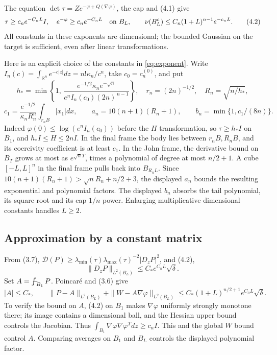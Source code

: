 \documentclass[11pt,reqno]{amsart}
\numberwithin{equation}{section}
\theoremstyle{remark}
\theoremstyle{definition}
\newcommand{\fint}{\mathop{\rlap{\hspace{0.15em}$-$}\!\int}\nolimits}
\begin{document}
The equation \(\det\tau=Z e^{-\varphi+Q(\nabla\varphi)}\), the cap and (4.1) give
\[
\tau\ge c_n e^{-C_nL}I,\quad e^{-\varphi}\ge c_ne^{-C_nL}
\quad\hbox{on }B_L,\qquad
\nu(B_L^c)\le C_n(1+L)^{n-1}e^{-c_nL}.                \tag{4.2}
\]
All constants in these exponents are dimensional; the bounded Gaussian on the target is sufficient, even after linear transformations.

Here is an explicit choice of the constants in \eqref{eq:exponent}. Write
\(I_n(c)=\int_{\mathbb R^n}e^{-c|z|}dz=n!\kappa_n/c^n\), take \(c_0=c_n^{(0)}\), and put
\[
h_*=\min\!\left\{1,\,
\frac{e^{-1/2}\kappa_n e^{-\sqrt n}}
{e^n I_n(c_0)(2n)^{\,n-1}}\right\},\quad
r_n=(2n)^{-1/2},\quad R_n=\sqrt{n/h_*},
\]
\[
c_1=\frac{e^{-1/2}}{\kappa_nR_n^n}
          \int_{r_nB}|x_1|dx,\qquad
a_n=10(n+1)(R_n+1),\qquad
b_n=\min\{1,c_1/(8n)\}.                               \tag{4.2a}
\]
Indeed \(\varphi(0)\le\log(e^nI_n(c_0))\) before the \(H\) transformation, so \(\tau\ge h_*I\) on \(B_1\), and \(h_*I\le H\le2nI\). In the final frame the body lies between \(r_nB,R_nB\), and its coercivity coefficient is at least \(c_1\). In the John frame, the derivative bound on $B_T$ grows at most as $e^{\sqrt n T}$, times a polynomial of degree at most $n/2+1$. A cube $[-L,L]^n$ in the final frame pulls back into $B_{R_nL}$. Since $10(n+1)(R_n+1)>\sqrt n R_n+n/2+3$, the displayed $a_n$ bounds the resulting exponential and polynomial factors. The displayed \(b_n\) absorbs the tail polynomial, its square root and its cap \(1/n\) power. Enlarging multiplicative dimensional constants handles \(L\ge2\). 

\subsection{Approximation by a constant matrix}

From (3.7), \(\mathscr D(P)\ge\lambda_{\min}(\tau)\lambda_{\max}(\tau)^{-2}|D_zP|^2\), and (4.2),
\[
\|D_zP\|_{L^2(B_L)}\le C_*e^{C_nL}\sqrt\delta.
\]
Set \(A=\fint_{B_1}P\). Poincar\'e and (3.6) give
\[
|A|\le C_*,\qquad
\|P-A\|_{L^2(B_L)}+
\|W-A\nabla\varphi\|_{L^2(B_L)}
\le C_*(1+L)^{n/2+1}e^{C_nL}\sqrt\delta.              \tag{4.3}
\]
To verify the bound on \(A\), (4.2) on \(B_1\) makes \(\nabla\varphi\) uniformly strongly monotone there; its image contains a dimensional ball, and the Hessian upper bound controls the Jacobian. Thus \(\int_{B_1}\nabla\varphi\nabla\varphi^Tdz\ge c_nI\). This and the global \(W\) bound control \(A\). Comparing averages on \(B_1\) and \(B_L\) controls the displayed polynomial factor.
\end{document}
